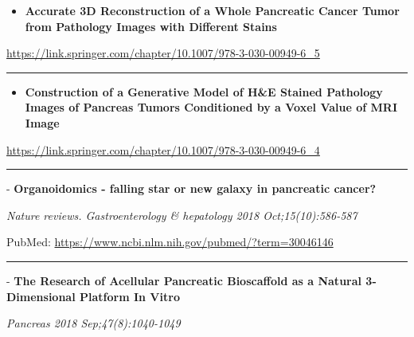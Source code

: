 \documentclass[]{article}
\providecommand{\tightlist}{%
  \setlength{\itemsep}{0pt}\setlength{\parskip}{0pt}}
\begin{document}
\begin{itemize}
\tightlist
\item
  \textbf{Accurate 3D Reconstruction of a Whole Pancreatic Cancer Tumor
  from Pathology Images with Different Stains}
\end{itemize}

\url{https://link.springer.com/chapter/10.1007/978-3-030-00949-6_5}

\begin{center}\rule{0.5\linewidth}{\linethickness}\end{center}

\begin{itemize}
\tightlist
\item
  \textbf{Construction of a Generative Model of H\&E Stained Pathology
  Images of Pancreas Tumors Conditioned by a Voxel Value of MRI Image}
\end{itemize}

\url{https://link.springer.com/chapter/10.1007/978-3-030-00949-6_4}

\begin{center}\rule{0.5\linewidth}{\linethickness}\end{center}

 - \textbf{Organoidomics - falling star or new galaxy in pancreatic
cancer?}

\emph{Nature reviews. Gastroenterology \& hepatology 2018
Oct;15(10):586-587}

PubMed: \url{https://www.ncbi.nlm.nih.gov/pubmed/?term=30046146}

{}

{}

\begin{center}\rule{0.5\linewidth}{\linethickness}\end{center}

 - \textbf{The Research of Acellular Pancreatic Bioscaffold as a Natural
3-Dimensional Platform In Vitro}

\emph{Pancreas 2018 Sep;47(8):1040-1049}
\end{document}
